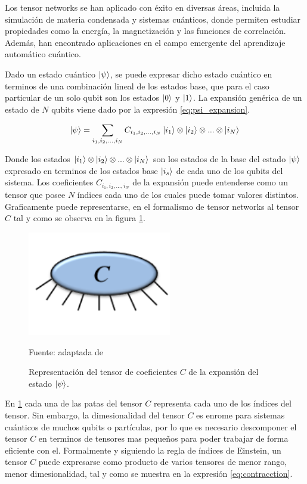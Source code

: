 Los tensor networks se han aplicado con éxito en diversas áreas, incluida la simulación de materia condensada y sistemas cuánticos, donde permiten estudiar propiedades como la energía, la magnetización y las funciones de correlación. Además, han encontrado aplicaciones en el campo emergente del aprendizaje automático cuántico. 

\newpage

Dado un estado cuántico $\ket{\psi}$, se puede expresar dicho estado cuántico en terminos de una combinación lineal de los estados base, que para el caso particular de un solo qubit son los estados $\ket{0}$ y $\ket{1}$. La expansión genérica de un estado de $N$ qubits viene dado por la expresión \ref{eq:psi_expansion}.

\begin{equation}
    \ket{\psi} = \sum_{i_1, i_2, ...,i_N} C_{i_1, i_2, ...,i_N} \ket{i_1}\otimes\ket{i_2}\otimes...\otimes \ket{i_N}
    \label{eq:psi_expansion}
\end{equation}

Donde los estados $\ket{i_1}\otimes\ket{i_2}\otimes...\otimes \ket{i_N}$ son los estados de la base del estado $\ket{\psi}$ expresado en terminos de los estados base $\ket{i_s}$ de cada uno de los qubits del sistema. Los coeficientes $C_{i_1, i_2, ...,i_N}$ de la expansión puede entenderse como un tensor que posee $N$ índices cada uno de los cuales puede tomar valores distintos. Graficamente puede representarse, en el formalismo de tensor networks al tensor $C$ tal y como se observa en la figura \ref{fig:orus}.

\begin{figure}[!ht]
    \centering
    \includegraphics[scale = 0.8]{img/03_tensor_coeficientes.png}
    \caption{Representación del tensor de coeficientes $C$  de la expansión del estado $\ket{\psi}$.}
    Fuente: adaptada de \citep{orus}
    \label{fig:orus}
\end{figure}

En \ref{fig:orus} cada una de las patas del tensor $C$ representa cada uno de los índices del tensor. Sin embargo, la dimesionalidad del tensor $C$ es enrome para sistemas cuánticos de muchos qubits o partículas, por lo que es necesario descomponer el tensor $C$ en terminos de tensores mas pequeños para poder trabajar de forma eficiente con el. Formalmente y siguiendo la regla de índices de Einstein, un tensor $C$ puede expresarse como producto de varios tensores de menor rango, menor dimesionalidad, tal y como se muestra en la expresión \ref{eq:contracction}.

